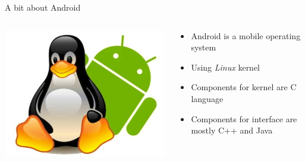 \documentclass{beamer}
\begin{document}
\begin{frame}{A bit about Android}

\begin{columns}[t]
 \begin{column}{5cm}
  
 \includegraphics[scale=0.35]{linux-android.jpg}
 
 
 \end{column}


\begin{column}{5cm}
 
 
 \begin{itemize}
  \item Android is a mobile operating system
  \item Using \emph{Linux} kernel
  \item Components for kernel are C language
  \item Components for interface are mostly C++ and Java
 \end{itemize}

 
\end{column}

 \end{columns}
 
\end{frame}
\end{document}
